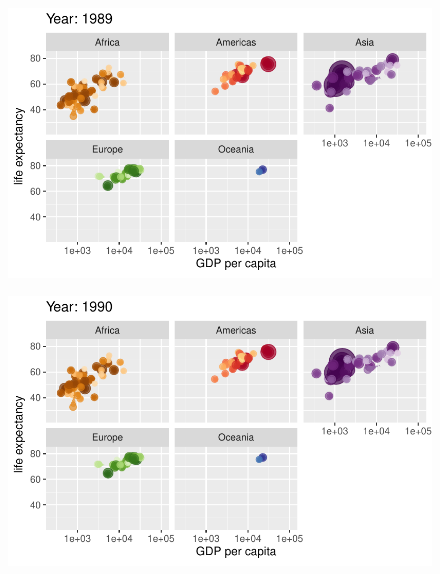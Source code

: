 \documentclass[
  letterpaper,
  DIV=11,
  numbers=noendperiod]{scrartcl}
\begin{document}
\begin{figure}[H]

{\centering \includegraphics{class05_files/figure-pdf/unnamed-chunk-24-68.pdf}

}

\end{figure}

\begin{figure}[H]

{\centering \includegraphics{class05_files/figure-pdf/unnamed-chunk-24-69.pdf}

}

\end{figure}
\end{document}
